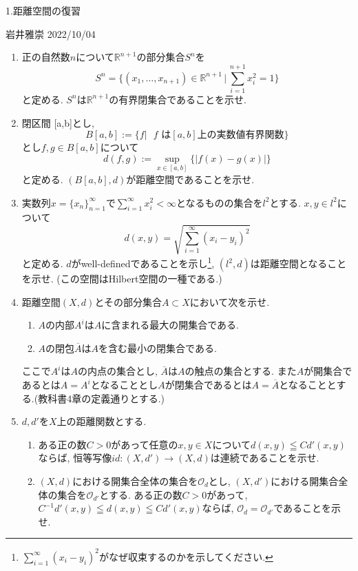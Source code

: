 \documentclass[dvipdfmx,a4paper,11pt]{article}
\newcommand{\R}{\mathbb{R}}
\theoremstyle{definition}
\begin{document}


\begin{center}
{\Large 1.距離空間の復習}
\end{center}
\begin{flushright}
 岩井雅崇 2022/10/04
\end{flushright}

\begin{enumerate}[label=\textbf{問}1.\arabic*]
\item 正の自然数$n$について$\R^{n+1}$の部分集合$S^n$を
$$
S^n = \{ (x_1, \ldots, x_{n+1}) \in \R^{n+1} \, |\,\sum_{i=1}^{n+1} x_{i}^{2} =1\}
$$
と定める. $S^n$は$\R^{n+1}$の有界閉集合であることを示せ.
\item 閉区間 [a,b]とし, 
$$
B[a,b]:= \{f | \text{ $f$ は$[a,b]$上の実数値有界関数} \}
$$
とし$f,g \in B[a,b]$について
$$
d(f,g) := \sup_{x \in [a,b]} \{ |f(x) - g(x)|\}
$$
と定める.  $(B[a,b],d)$が距離空間であることを示せ.


 \item  実数列$x = \{ x_n\}_{n=1}^{\infty}$で$\sum_{i=1}^{\infty} x_{i}^{2} < \infty$となるものの集合を$l^2$とする.
 $x,y \in l^2$について
 $$
 d(x,y) = \sqrt{ \sum_{i=1}^{\infty} (x_i - y_i)^2}
 $$
 と定める. $d$がwell-definedであることを示し\footnote{$\sum_{i=1}^{\infty} (x_i - y_i)^2$がなぜ収束するのかを示してください.}, $(l^2,d)$は距離空間となることを示せ. (この空間はHilbert空間の一種である.)
 

  
 \item 距離空間$(X,d)$とその部分集合$A \subset X$において次を示せ.
	 \begin{enumerate}
 	\item $A$の内部$A^i$は$A$に含まれる最大の開集合である.
 	\item $A$の閉包$\overline{A}$は$A$を含む最小の閉集合である.
 	\end{enumerate}
 ここで$A^i$は$A$の内点の集合とし, $\overline{A}$は$A$の触点の集合とする.
 また$A$が開集合であるとは$A = A^i$となることとし$A$が閉集合であるとは$A = \overline{A}$となることとする.(教科書4章の定義通りとする.)
 
\item $d,d'$を$X$上の距離関数とする. 
	\begin{enumerate}
	\item ある正の数$C>0$があって任意の$x,y \in X$について$d(x,y) \leqq Cd'(x,y)$ならば, 恒等写像$id : (X, d') \rightarrow (X,d)$は連続であることを示せ.
	\item $(X,d)$における開集合全体の集合を$\mathscr{O}_d$とし, $(X,d')$における開集合全体の集合を$\mathscr{O}_{d'}$とする. ある正の数$C>0$があって, $C^{-1} d'(x,y)\leqq d(x,y) \leqq Cd'(x,y)$ならば, $\mathscr{O}_d = \mathscr{O}_{d'}$であることを示せ.
	\end{enumerate}


\end{enumerate}
\end{document}
